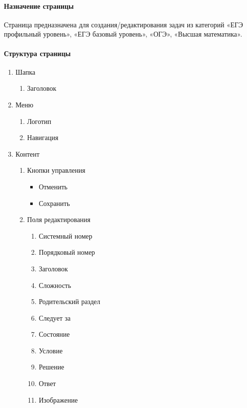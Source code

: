 \paragraph{Назначение страницы}
Страница предназначена для создания/редактирования задач из категорий «ЕГЭ профильный уровень», «ЕГЭ базовый уровень», «ОГЭ», «Высшая математика».

\paragraph{Структура страницы}
\begin{enumerate}
    \item Шапка
    \begin{enumerate}
        \item Заголовок
    \end{enumerate}

    \item Меню
    \begin{enumerate}
        \item Логотип
        \item Навигация
    \end{enumerate}

    \item Контент
    \begin{enumerate}
        \item Кнопки управления
        \begin{itemize}
            \item Отменить
            \item Сохранить
        \end{itemize}

        \item Поля редактирования
        \begin{enumerate}
            \item Системный номер
            \item Порядковый номер
            \item Заголовок
            \item Сложность
            \item Родительский раздел
            \item Следует за
            \item Состояние
            \item Условие
            \item Решение
            \item Ответ
            \item Изображение
        \end{enumerate}
    \end{enumerate}
\end{enumerate}

